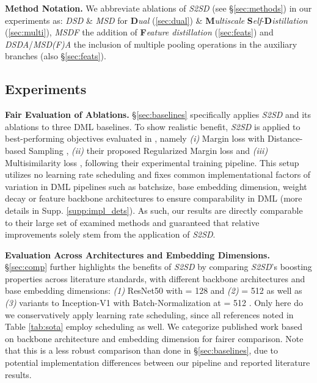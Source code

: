 \documentclass{article} \usepackage{arxiv_style,times}
\begin{document}
\textbf{Method Notation.} We abbreviate ablations of \textit{S2SD} (see \S\ref{sec:methods}) in our experiments as: 
\textit{DSD} \& \textit{MSD} for \textbf{D}\textit{ual} (\ref{sec:dual}) \& \textbf{M}\textit{ultiscale} \textbf{S}\textit{elf}-\textbf{D}\textit{istillation} (\ref{sec:multi}), \textit{MSDF} the addition of \textbf{F}\textit{eature distillation} (\ref{sec:feats}) and \textit{DSDA}/\textit{MSD(F)A} the inclusion of multiple pooling operations in the auxiliary branches (also \S\ref{sec:feats}).

\subsection{Experiments}
\textbf{Fair Evaluation of Ablations.} \S\ref{sec:baselines} specifically applies \textit{S2SD} and its ablations to three DML baselines. To show realistic benefit, \textit{S2SD} is applied to best-performing objectives evaluated in \cite{roth2020revisiting}, namely \textit{(i)} Margin loss with Distance-based Sampling \citep{margin}, \textit{(ii)} their proposed Regularized Margin loss and \textit{(iii)} Multisimilarity loss \citep{multisimilarity}, following their experimental training pipeline. This setup utilizes no learning rate scheduling and fixes common implementational factors of variation in DML pipelines such as batchsize, base embedding dimension, weight decay or feature backbone architectures to ensure comparability in DML (more details in Supp. \ref{supp:impl_dets}). 
As such, our results are directly comparable to their large set of examined methods and guaranteed that relative improvements solely stem from the application of \textit{S2SD}.

\textbf{Evaluation Across Architectures and Embedding Dimensions.} \S\ref{sec:comp} further highlights the benefits of \textit{S2SD} by comparing \textit{S2SD}'s boosting properties across literature standards, with different backbone architectures and base embedding dimensions: \textit{(1)} ResNet50 with  = 128 \citep{margin,mic} and \textit{(2)}  = 512 \citep{zhai2018classification} as well as \textit{(3)} variants to Inception-V1 with Batch-Normalization at  = 512 \citep{multisimilarity,softriple,milbich2020diva}.
Only here do we conservatively apply learning rate scheduling, since all references noted in Table \ref{tab:sota} employ scheduling as well. We categorize published work based on backbone architecture and embedding dimension for fairer comparison. Note that this is a less robust comparison than done in \S \ref{sec:baselines}, due to potential implementation differences between our pipeline and reported literature results.
\end{document}
